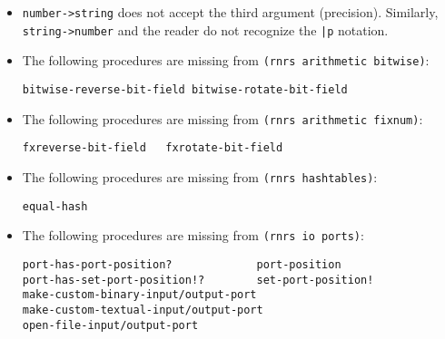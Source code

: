 \documentclass[onecolumn, 12pt, twoside, openright, dvipdfm]{book}
\begin{document}
\begin{itemize}
\item \texttt{number->string} does not accept the third argument
(precision).  Similarly, \texttt{string->number} and the reader do
not recognize the \texttt{|p} notation. 


\item The following procedures are missing from \texttt{(rnrs arithmetic
bitwise)}:
\begin{Verbatim}
bitwise-reverse-bit-field bitwise-rotate-bit-field 
\end{Verbatim}

\item The following procedures are missing from \texttt{(rnrs arithmetic
fixnum)}:
\begin{Verbatim}
fxreverse-bit-field   fxrotate-bit-field   
\end{Verbatim}


\item The following procedures are missing from \texttt{(rnrs hashtables)}:
\begin{Verbatim}
equal-hash
\end{Verbatim}

\item The following procedures are missing from \texttt{(rnrs io ports)}:
\begin{Verbatim}
port-has-port-position?             port-position
port-has-set-port-position!?        set-port-position!
make-custom-binary-input/output-port    
make-custom-textual-input/output-port 
open-file-input/output-port
\end{Verbatim}

\end{itemize}



\nocite{ghuloum-implicit}
\nocite{ghuloum-generation}

\newpage
\backmatter
\appendix
{}


\newpage
{}
{}
\printindex
\end{document}
